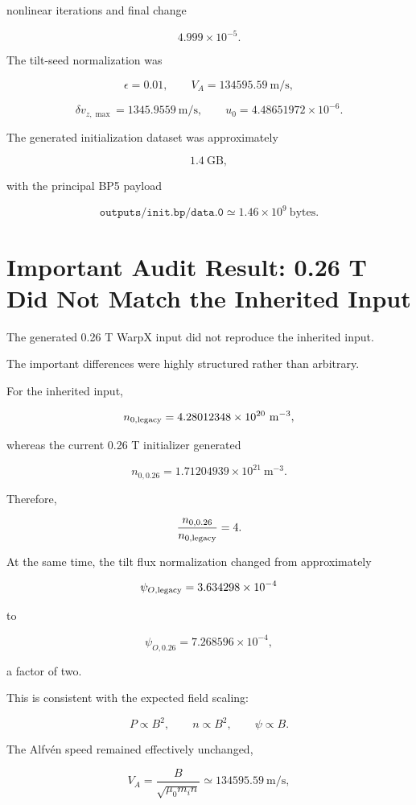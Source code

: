 \documentclass[11pt,a4paper]{article}
\begin{document}
nonlinear iterations and final change

\[
4.999\times10^{-5}.
\]

The tilt-seed normalization was

\[
\epsilon=0.01,
\qquad
V_A=134595.59~\mathrm{m/s},
\]

\[
\delta v_{z,\max}=1345.9559~\mathrm{m/s},
\qquad
u_0=4.48651972\times10^{-6}.
\]

The generated initialization dataset was approximately

\[
1.4~\mathrm{GB},
\]

with the principal BP5 payload

\[
\texttt{outputs/init.bp/data.0}
\simeq
1.46\times10^9~\mathrm{bytes}.
\]

\section{Important Audit Result: 0.26 T Did Not Match the Inherited Input}

The generated 0.26 T WarpX input did not reproduce the inherited input.

The important differences were highly structured rather than arbitrary.

For the inherited input,

\[
n_{0,\rm legacy}
=
4.28012348\times10^{20}~\mathrm{m^{-3}},
\]

whereas the current 0.26 T initializer generated

\[
n_{0,0.26}
=
1.71204939\times10^{21}~\mathrm{m^{-3}}.
\]

Therefore,

\[
\frac{n_{0,0.26}}{n_{0,\rm legacy}}
=
4.
\]

At the same time, the tilt flux normalization changed from approximately

\[
\psi_{O,\rm legacy}
=
3.634298\times10^{-4}
\]

to

\[
\psi_{O,0.26}
=
7.268596\times10^{-4},
\]

a factor of two.

This is consistent with the expected field scaling:

\[
P \propto B^2,
\qquad
n \propto B^2,
\qquad
\psi\propto B.
\]

The Alfv\'en speed remained effectively unchanged,

\[
V_A
=
\frac{B}{\sqrt{\mu_0m_i n}}
\simeq
134595.59~\mathrm{m/s},
\]
\end{document}
